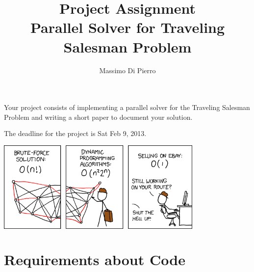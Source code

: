\documentclass[12pt]{article}
\title{Project Assignment\\
Parallel Solver for Traveling Salesman Problem}
\author{Massimo Di Pierro}
\begin{document}
\maketitle

Your project consists of implementing a parallel solver for the
Traveling Salesman Problem and writing a short paper to document your
solution.

The deadline for the project is Sat Feb 9, 2013.

\begin{center}
\includegraphics[width=4in]{travelling.png}
\end{center}

\section{Requirements about Code}
\end{document}
